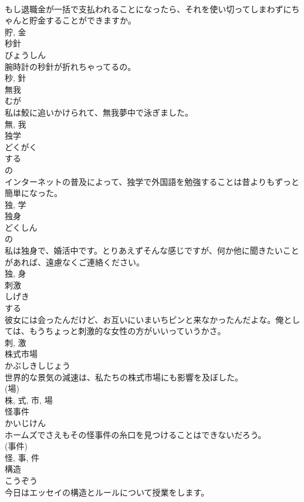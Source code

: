 \documentclass[8pt]{extreport}
\begin{document}
\begin{CJK}{UTF8}{min}
\\	もし退職金が一括で支払われることになったら、それを使い切ってしまわずにちゃんと貯金することができますか。	
\\	貯, 金	
\\	秒針	
\\	びょうしん	
\\	腕時計の秒針が折れちゃってるの。	
\\	秒, 針	
\\	無我	
\\	むが	
\\	私は鮫に追いかけられて、無我夢中で泳ぎました。	
\\	無, 我	
\\	独学	
\\	どくがく	
\\	する 
\\	の 
\\	インターネットの普及によって、独学で外国語を勉強することは昔よりもずっと簡単になった。	
\\	独, 学	
\\	独身	
\\	どくしん	
\\	の 
\\	私は独身で、婚活中です。とりあえずそんな感じですが、何か他に聞きたいことがあれば、遠慮なくご連絡ください。	
\\	独, 身	
\\	刺激	
\\	しげき	
\\	する 
\\	彼女には会ったんだけど、お互いにいまいちピンと来なかったんだよな。俺としては、もうちょっと刺激的な女性の方がいいっていうかさ。	
\\	刺, 激	
\\	株式市場	
\\	かぶしきしじょう	
\\	世界的な景気の減速は、私たちの株式市場にも影響を及ぼした。	
\\	(場) 
\\	株, 式, 市, 場	
\\	怪事件	
\\	かいじけん	
\\	ホームズでさえもその怪事件の糸口を見つけることはできないだろう。	
\\	(事件) 
\\	怪, 事, 件	
\\	構造	
\\	こうぞう	
\\	今日はエッセイの構造とルールについて授業をします。	

\end{CJK}
\end{document}
